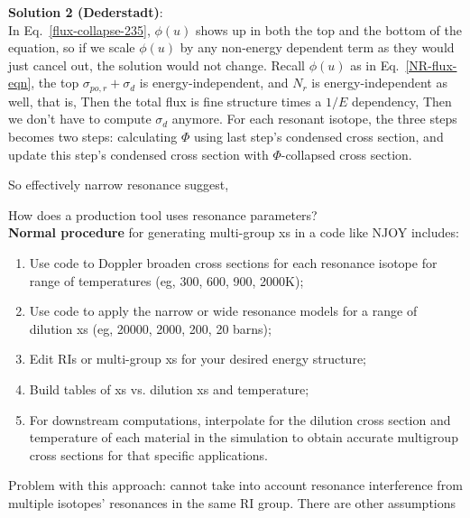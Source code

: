 \documentclass{school-22.211-notes}
\begin{document}
\begin{enumerate}
\textbf{Solution 2 (Dederstadt)}: \\
In Eq.~\ref{flux-collapse-235}, $\phi(u)$ shows up in both the top and the bottom of the equation, so if we scale $\phi(u)$ by any non-energy dependent term as they would just cancel out, the solution would not change. Recall $\phi(u)$ as in Eq.~\ref{NR-flux-eqn}, the top $\sigma_{po,r} + \sigma_d$ is energy-independent, and $N_r$ is energy-independent as well, that is, 
Then the total flux is fine structure times a $1/E$ dependency, 
Then we don't have to compute $\sigma_d$ anymore. For each resonant isotope, the three steps becomes two steps: calculating $\Phi$ using last step's condensed cross section, and update this step's condensed cross section with $\Phi$-collapsed cross section. 

So effectively narrow resonance suggest, 
\end{enumerate}


\clearpage
{}
How does a production tool uses resonance parameters?\\
\textbf{Normal procedure} for generating multi-group xs in a code like NJOY includes:
\begin{enumerate}
\item Use code to Doppler broaden cross sections for each resonance isotope for range of temperatures (eg, 300, 600, 900, 2000K); 
\item Use code to apply the narrow or wide resonance models for a range of dilution xs (eg, 20000, 2000, 200, 20 barns); 
\item Edit RIs or multi-group xs for your desired energy structure; 
\item Build tables of xs vs. dilution xs and temperature;
\item For downstream computations, interpolate for the dilution cross section and temperature of each material in the simulation to obtain accurate multigroup cross sections for that specific applications. 
\end{enumerate}
Problem with this approach: cannot take into account resonance interference from multiple isotopes' resonances in the same RI group. There are other assumptions
\end{document}
